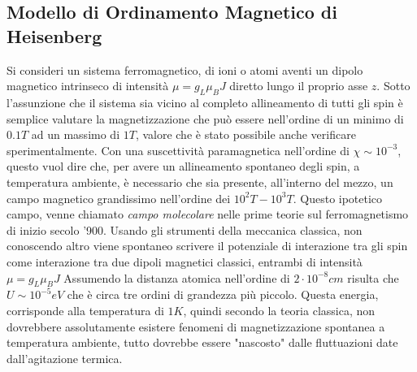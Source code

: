 \subsection{Modello di Ordinamento Magnetico di Heisenberg}
Si consideri un sistema ferromagnetico, di ioni o atomi aventi un dipolo magnetico intrinseco di intensit\`a $\mu = g_L\mu_BJ$ diretto lungo il proprio asse $z$. Sotto l'assunzione che il sistema sia vicino al completo allineamento di tutti gli spin \`e semplice valutare la magnetizzazione che pu\`o essere nell'ordine di un minimo di $0.1T$ ad un massimo di $1T$, valore che \`e stato possibile anche verificare sperimentalmente. Con una suscettivit\`a paramagnetica nell'ordine di $\chi \sim 10^{-3}$, questo vuol dire che, per avere un allineamento spontaneo degli spin, a temperatura ambiente, \`e necessario che sia presente, all'interno del mezzo, un campo magnetico grandissimo nell'ordine dei $10^2T - 10^3T$. Questo ipotetico campo, venne chiamato \textit{campo molecolare} nelle prime teorie sul ferromagnetismo di inizio secolo '900. 
Usando gli strumenti della meccanica classica, non conoscendo altro viene spontaneo scrivere il potenziale di interazione tra gli spin come interazione tra due dipoli magnetici classici, entrambi di intensit\`a $\mu=g_L\mu_BJ$
Assumendo la distanza atomica nell'ordine di $2\cdot10^{-8}cm$ risulta che $U\sim10^{-5} eV$ che \`e circa tre ordini di grandezza pi\`u piccolo. Questa energia, corrisponde alla temperatura di $1K$, quindi secondo la teoria classica, non dovrebbere assolutamente esistere fenomeni di magnetizzazione spontanea a temperatura ambiente, tutto dovrebbe essere "nascosto" dalle fluttuazioni date dall'agitazione termica.

 


